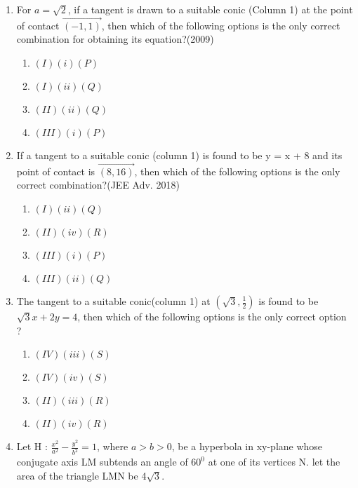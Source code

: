 \begin{enumerate}
\begin{table}[h!]
\begin{tabular}{|c|c|c|c|}
\hline
\end{tabular}

\end{table}

\item For $a =\sqrt{2}$, if a tangent is drawn to a suitable conic (Column 1) at the point of contact $\vec{(-1, 1)}$, then which of the following
options is the only correct combination for obtaining its equation?\hfill{(2009)}

\begin{enumerate}[label=(\alph*)]
    \item $(I)(i)(P)$
    \item $(I)(ii)(Q)$
    \item $(II)(ii)(Q)$
    \item $(III)(i)(P)$
\end{enumerate}

\item If a tangent to a suitable conic (column 1) is found to be y = x + 8 and its point of contact is $\vec{(8, 16)}$, then which of the following
options is the only correct combination?\hfill {(JEE Adv. 2018)}

\begin{enumerate}[label=(\alph*)]
    \item $(I)(ii)(Q)$
    \item $(II)(iv)(R)$
    \item $(III)(i)(P)$
    \item $(III)(ii)(Q)$
\end{enumerate}

\item  The tangent to a suitable conic(column 1) at $(\sqrt{3},\frac{1}{2})$ is found to be $\sqrt{3}x + 2y = 4$, then which of the following options is the only correct option ? 

\begin{enumerate}[label=(\alph*)]
    \item $(IV)(iii)(S)$
    \item $(IV)(iv)(S)$
    \item $(II)(iii)(R)$
    \item $(II)(iv)(R)$
\end{enumerate}

 \item Let H : $\frac{x^2}{a^2}-\frac{y^2}{b^2}= 1$, where $a>b>0$, be a hyperbola in xy-plane whose conjugate axis LM subtends an angle of $60^0$ at one of its vertices N. let the area of the triangle LMN be 4$\sqrt{3}$.


\end{enumerate}
